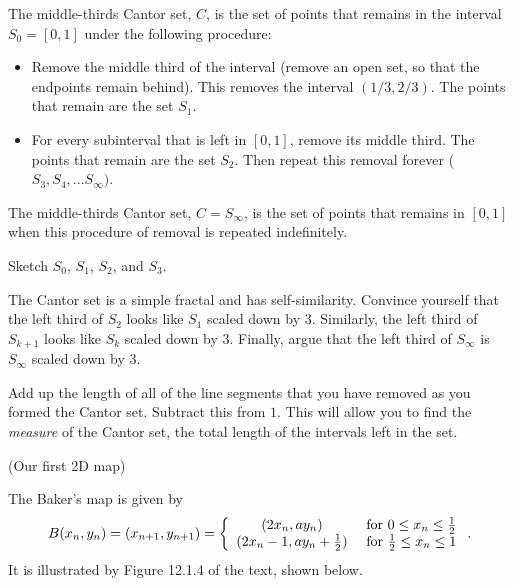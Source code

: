 \documentclass[12pt,letterpaper,noanswers]{exam}
\begin{document}
\begin{questions}
\question The middle-thirds Cantor set, $C$, is the set of points that remains in the interval $S_0 = [0,1]$ under the following procedure: 
\begin{itemize}
\item Remove the middle third of the interval (remove an open set, so that the endpoints remain behind).  This removes the interval $(1/3, 2/3)$.  The points that remain are the set $S_1$.
\item For every subinterval that is left in $[0,1]$, remove its middle third.  The points that remain are the set $S_2$. Then repeat this removal forever ($S_3, S_4, ... S_\infty)$.
\end{itemize}
The middle-thirds Cantor set, $C = S_\infty$, is the set of points that remains in $[0,1]$ when this procedure of removal is repeated indefinitely.
\begin{parts}
\item Sketch $S_0$, $S_1$, $S_2$, and $S_3$.
\item The Cantor set is a simple fractal and has self-similarity.  Convince yourself that the left third of $S_2$ looks like $S_1$ scaled down by $3$.  Similarly, the left third of $S_{k+1}$ looks like $S_{k}$ scaled down by $3$.  Finally, argue that the left third of $S_\infty$ is $S_\infty$ scaled down by $3$.
\item Add up the length of all of the line segments that you have removed as you formed the Cantor set.  Subtract this from $1$.  This will allow you to find the \emph{measure} of the Cantor set, the total length of the intervals left in the set.
\end{parts}

\question (Our first 2D map) 

The Baker's map is given by
\[B(x_n,y_n)= (x_{n+1},y_{n+1}) = \left\{ \begin{array}{c c} (2x_n, ay_n) &\mbox{ for } 0\leq x_n \leq \frac{1}{2} \\ (2x_n-1, ay_n+\frac{1}{2}) &\mbox{ for } \frac{1}{2} \leq x_n \leq 1 \end{array} \right. .\]  It is illustrated by Figure 12.1.4 of the text, shown below.


\end{questions}
\end{document}
